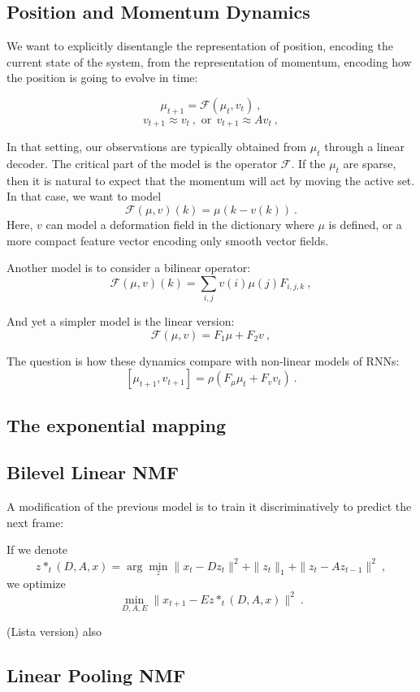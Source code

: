 \documentclass[11pt]{article} %
\begin{document}
\subsection{Position and Momentum Dynamics}

We want to explicitly disentangle the representation of position, encoding 
the current state of the system, from the representation of momentum, encoding 
how the position is going to evolve in time:

$$\mu_{t+1} = \mathcal{F}(\mu_t, v_t)~,$$
$$v_{t+1} \approx v_{t}~,\mbox{ or} ~~v_{t+1} \approx A v_{t}~,$$

In that setting, our observations are typically obtained from $\mu_t$ through a linear decoder. 
The critical part of the model is the operator $\mathcal{F}$.
If the $\mu_t$ are sparse, then it is natural to expect that the momentum will act by moving the active set. 
In that case, we want to model 
$$\mathcal{F}(\mu, v)(k)= \mu(k - v(k))~.$$
Here, $v$ can model a deformation field in the dictionary where $\mu$ is defined, or a more compact
feature vector encoding only smooth vector fields.

Another model is to consider a bilinear operator:
$$\mathcal{F}(\mu, v)(k) = \sum_{i,j} v(i) \mu(j) F_{i,j,k}~,$$

And yet a simpler model is the linear version:
$$\mathcal{F}(\mu, v) = F_1 \mu + F_2 v~,$$

The question is how these dynamics compare with non-linear models of RNNs:
$$[\mu_{t+1}, v_{t+1}] = \rho( F_\mu \mu_t + F_v v_t)~.$$


\subsection{The exponential mapping} 


\subsection{Bilevel Linear NMF}

A modification of the previous model is to train it discriminatively to predict the next frame:

If we denote 
$$z*_t(D, A, x) = \arg \min_z \| x_t - D z_t \|^2 + \|z_t \|_1 +  \| z_t - A z_{t-1} \|^2~,$$
we optimize
$$\min_{D, A, E} \| x_{t+1} - E z*_t(D, A, x) \|^2~.$$

(Lista version) also 


\subsection{Linear Pooling NMF}
\end{document}
